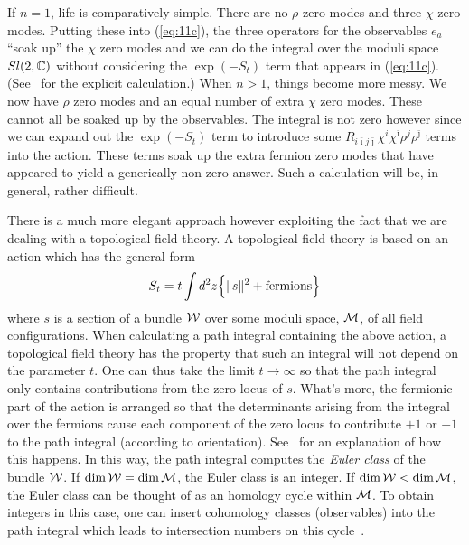 If $n=1$, life is comparatively simple. There are no $\rho$ zero modes
and three $\chi$ zero modes. Putting these into (\ref{eq:11c}), the three
operators for the observables $e_a$ ``soak up''
the $\chi$ zero modes and we can do the
integral over the moduli space $Sl(2,\Bbb{C})$ without considering the
$\exp(-S_t)$ term that appears in (\ref{eq:11c}). (See~\cite{DG:exact}
for the explicit calculation.) When $n>1$, things become more messy.
We now have $\rho$ zero modes and an equal number of extra $\chi$ zero
modes. These cannot all be soaked up by the observables. The integral is
not zero however since we can expand out the $\exp(-S_t)$ term to
introduce some $R_{i\bar\imath j\bar\jmath}\chi^i\chi^{\bar\imath}
\rho^j\rho^{\bar\jmath}$ terms into the action. These terms soak up
the extra fermion zero modes that have appeared to yield a
generically non-zero
answer. Such a calculation will be, in general, rather difficult.

There is a much more elegant approach however exploiting the fact that
we are dealing with a topological field theory. A topological field
theory is based on an action which has the general form
\begin{equation}
  S_t=t\int d^2z\Big\{\|s\|^2 + \hbox{fermions}\Big\} \label{eq:act1}
\end{equation}
where $s$ is a section of a bundle $\cal{W}$ over some moduli
space, $\cal{M}$, of all field configurations. When calculating a path integral
containing the above action, a topological field theory has the
property that such an integral will not depend on the parameter $t$.
One can thus take the limit $t\to\infty$ so that the path integral
only contains contributions from the zero locus of $s$. What's more,
the fermionic part of the action is arranged so that the determinants
arising from the integral over the fermions cause each component
of the zero
locus to contribute $+1$ or $-1$ to the path integral (according to
orientation). See~\cite{W:tqft} for an explanation of how this happens.
In this way, the path integral computes the {\em Euler class\/} of the
bundle $\cal{W}$. If $\dim\cal{W}=\dim\cal{M}$, the Euler class is an integer. If
$\dim\cal{W}<\dim\cal{M}$, the Euler class can be thought of as an homology
cycle within $\cal{M}$. To obtain integers in this case, one can insert
cohomology classes (observables) into the path integral which leads to
intersection numbers on this cycle~\cite{W:tqft,W:tsm}.

